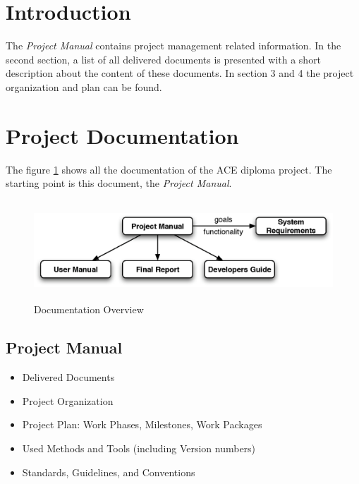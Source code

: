 \documentclass[11pt,a4paper]{article}
\begin{document}
\setlength{\parindent}{0pt}



\tableofcontents

\setlength{\parskip}{6pt}

\newpage


\section{Introduction}
The \emph{Project Manual} contains project management related information.
In the second section, a list of all delivered documents is presented with
a short description about the content of these documents. In section 3 and
4 the project organization and plan can be found.


\section{Project Documentation}
The figure \ref{fig:documentation overview} shows all the documentation of
the ACE diploma project. The starting point is this document, the 
\emph{Project Manual}.

\begin{figure}[H]
 \centering
 \includegraphics[width=15cm,height=3.73cm]{../images/projectmanagement/documents.eps}
 \caption{Documentation Overview}
 \label{fig:documentation overview}
\end{figure}

\subsection{Project Manual}
\begin{itemize}
 \item Delivered Documents
 \item Project Organization
 \item Project Plan: Work Phases, Milestones, Work Packages
 \item Used Methods and Tools (including Version numbers)
 \item Standards, Guidelines, and Conventions
\end{itemize}
\end{document}
